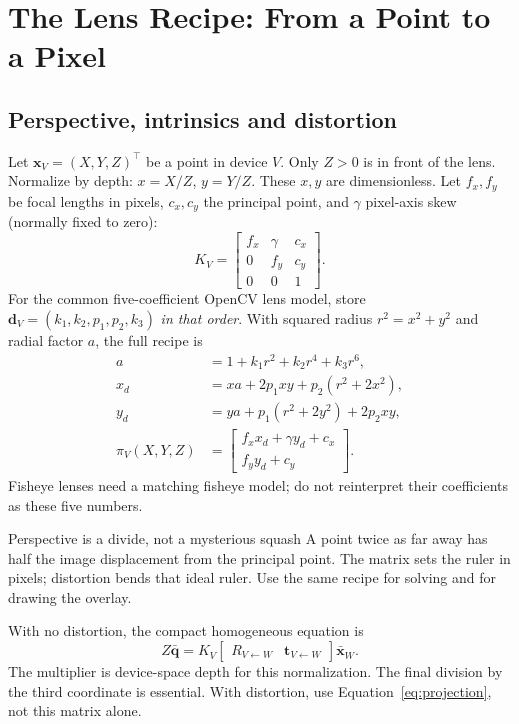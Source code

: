 \documentclass[11pt,a4paper]{article}
\newcommand{\Rot}[2]{R_{#1\leftarrow #2}}
\newcommand{\tr}[2]{\bm{t}_{#1\leftarrow #2}}
\newcommand{\pt}[1]{\bm{x}_{#1}}
\newcommand{\hpt}[1]{\bar{\bm{x}}_{#1}}
\begin{document}
\section{The Lens Recipe: From a Point to a Pixel}
\label{sec:lens}

\subsection{Perspective, intrinsics and distortion}
Let $\pt{V}=(X,Y,Z)^\top$ be a point in device $V$.
Only $Z>0$ is in front of the lens. Normalize by depth:
$x=X/Z$, $y=Y/Z$. These $x,y$ are dimensionless.
Let $f_x,f_y$ be focal lengths in pixels, $c_x,c_y$ the principal point,
and $\gamma$ pixel-axis skew (normally fixed to zero):
\begin{equation}
K_V=\begin{bmatrix}f_x&\gamma&c_x\\0&f_y&c_y\\0&0&1\end{bmatrix}.
\end{equation}
For the common five-coefficient OpenCV lens model, store
$\bm{d}_V=(k_1,k_2,p_1,p_2,k_3)$ \emph{in that order}. With squared
radius $r^2=x^2+y^2$ and radial factor $a$, the full recipe is
\begin{align}
a&=1+k_1r^2+k_2r^4+k_3r^6,\\
x_d&=xa+2p_1xy+p_2(r^2+2x^2),\\
y_d&=ya+p_1(r^2+2y^2)+2p_2xy,\\
\pi_V(X,Y,Z)&=
\begin{bmatrix}f_xx_d+\gamma y_d+c_x\\f_yy_d+c_y\end{bmatrix}.
\label{eq:projection}
\end{align}
Fisheye lenses need a matching fisheye model; do not reinterpret their
coefficients as these five numbers.

\begin{plain}{Perspective is a divide, not a mysterious squash}
A point twice as far away has half the image displacement from the
principal point. The matrix sets the ruler in pixels; distortion bends that
ideal ruler. Use the same recipe for solving and for drawing the overlay.
\end{plain}

With no distortion, the compact homogeneous equation is
\begin{equation}
Z\bar{\bm{q}}=K_V
\begin{bmatrix}\Rot{V}{W}&\tr{V}{W}\end{bmatrix}\hpt{W}.
\end{equation}
The multiplier is device-space depth for this normalization. The final
division by the third coordinate is essential. With distortion, use
Equation~\eqref{eq:projection}, not this matrix alone.
\end{document}
